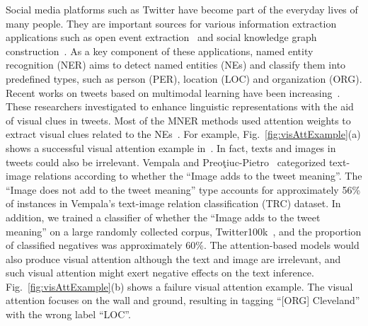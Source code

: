 \documentclass[letterpaper]{article} \usepackage{aaai21}  \usepackage{times}  \usepackage{helvet} \usepackage{courier}  \usepackage[hyphens]{url}  \usepackage{graphicx} \urlstyle{rm} \def\UrlFont{\rm}  \usepackage{natbib}  \usepackage{caption} \frenchspacing  \setlength{\pdfpagewidth}{8.5in}  \setlength{\pdfpageheight}{11in}
\begin{document}
Social media platforms such as Twitter have become part of the everyday lives of many people.
They are important sources for various information extraction applications such as open event extraction~\cite{wang2019open} and social knowledge graph construction~\cite{hosseini2019implicit}.
As a key component of these  applications, named entity recognition (NER) aims to detect named entities (NEs) and classify them into predefined types, such as person (PER), location (LOC) and organization (ORG).
Recent works on tweets based on multimodal learning have been increasing~\cite{moon2018multimodal,lu2018visual,zhang2018adaptive,arshad2019aiding,yu2020improving}.
These researchers investigated to enhance linguistic representations with the aid of visual clues in tweets.
Most of the MNER methods used attention weights to extract visual clues related to the NEs~\cite{lu2018visual,zhang2018adaptive,arshad2019aiding}.
For example, Fig.~\ref{fig:visAttExample}(a) shows a successful visual attention example in~\cite{lu2018visual}.
In fact, texts and images in tweets could also be irrelevant.
Vempala and Preo{\c{t}}iuc-Pietro~ categorized  text-image relations according to  whether the ``Image adds to the tweet meaning''.
The ``Image does not add to the tweet meaning''  type accounts for approximately 56\% of instances in Vempala's text-image relation classification (TRC) dataset.
In addition, we trained a classifier of whether the ``Image adds to the tweet meaning'' on a large randomly collected corpus, Twitter100k~\cite{hu2017twitter100k},  and the proportion of  classified negatives was approximately 60\%.
The attention-based models would also produce visual attention although the text and image are irrelevant, 
and such visual attention might exert negative effects on the text inference.
Fig.~\ref{fig:visAttExample}(b) shows a failure visual attention example.
The visual attention focuses on the wall and ground, resulting in tagging ``[ORG] Cleveland'' with the wrong label ``LOC''.
\end{document}
